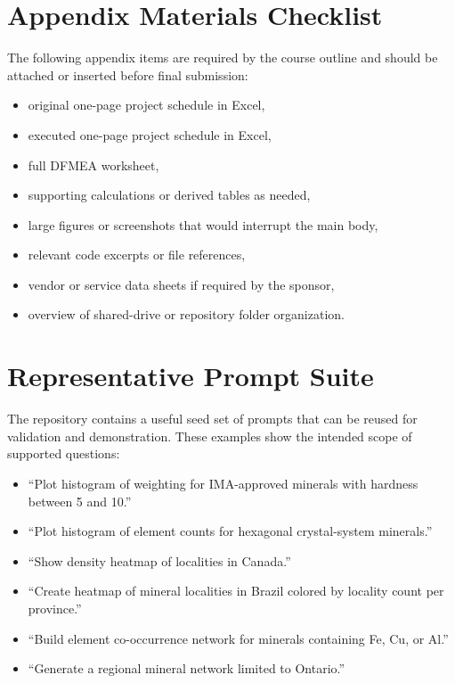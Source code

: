 \documentclass[12pt,oneside]{report}
\begin{document}
\appendix

\section{Appendix Materials Checklist}

The following appendix items are required by the course outline and should be attached or inserted before final submission:
\begin{itemize}[leftmargin=0.75in]
    \item original one-page project schedule in Excel,
    \item executed one-page project schedule in Excel,
    \item full DFMEA worksheet,
    \item supporting calculations or derived tables as needed,
    \item large figures or screenshots that would interrupt the main body,
    \item relevant code excerpts or file references,
    \item vendor or service data sheets if required by the sponsor,
    \item overview of shared-drive or repository folder organization.
\end{itemize}

\section{Representative Prompt Suite}

The repository contains a useful seed set of prompts that can be reused for validation and demonstration. These examples show the intended scope of supported questions:

\begin{itemize}[leftmargin=0.75in]
    \item ``Plot histogram of weighting for IMA-approved minerals with hardness between 5 and 10.''
    \item ``Plot histogram of element counts for hexagonal crystal-system minerals.''
    \item ``Show density heatmap of localities in Canada.''
    \item ``Create heatmap of mineral localities in Brazil colored by locality count per province.''
    \item ``Build element co-occurrence network for minerals containing Fe, Cu, or Al.''
    \item ``Generate a regional mineral network limited to Ontario.''
\end{itemize}
\end{document}
